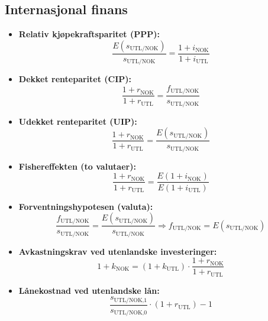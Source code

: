 \documentclass[
  11pt,
  a4paper,
]{article}
\begin{document}
\subsection{Internasjonal finans}\label{internasjonal-finans}

\begin{itemize}
\item
  \textbf{Relativ kjøpekraftsparitet (PPP):}\\
  \[
  \frac{E(s_{\text{UTL/NOK}})}{s_{\text{UTL/NOK}}} = \frac{1 + i_{\text{NOK}}}{1 + i_{\text{UTL}}}
  \]
\item
  \textbf{Dekket renteparitet (CIP):}\\
  \[
  \frac{1 + r_{\text{NOK}}}{1 + r_{\text{UTL}}} = \frac{f_{\text{UTL/NOK}}}{s_{\text{UTL/NOK}}}
  \]
\item
  \textbf{Udekket renteparitet (UIP):}\\
  \[
  \frac{1 + r_{\text{NOK}}}{1 + r_{\text{UTL}}} = \frac{E(s_{\text{UTL/NOK}})}{s_{\text{UTL/NOK}}}
  \]
\item
  \textbf{Fishereffekten (to valutaer):}\\
  \[
  \frac{1 + r_{\text{NOK}}}{1 + r_{\text{UTL}}} = \frac{E(1 + i_{\text{NOK}})}{E(1 + i_{\text{UTL}})}
  \]
\item
  \textbf{Forventningshypotesen (valuta):}\\
  \[
  \frac{f_{\text{UTL/NOK}}}{s_{\text{UTL/NOK}}} = \frac{E(s_{\text{UTL/NOK}})}{s_{\text{UTL/NOK}}} \Rightarrow f_{\text{UTL/NOK}} = E(s_{\text{UTL/NOK}})
  \]
\item
  \textbf{Avkastningskrav ved utenlandske investeringer:}\\
  \[
  1 + k_{\text{NOK}} = (1 + k_{\text{UTL}}) \cdot \frac{1 + r_{\text{NOK}}}{1 + r_{\text{UTL}}}
  \]
\item
  \textbf{Lånekostnad ved utenlandske lån:}\\
  \[
   \frac{s_{\text{UTL/NOK,1}}}{s_{\text{UTL/NOK,0}}} \cdot (1 + r_{\text{UTL}}) - 1
  \]
\end{itemize}
\end{document}

